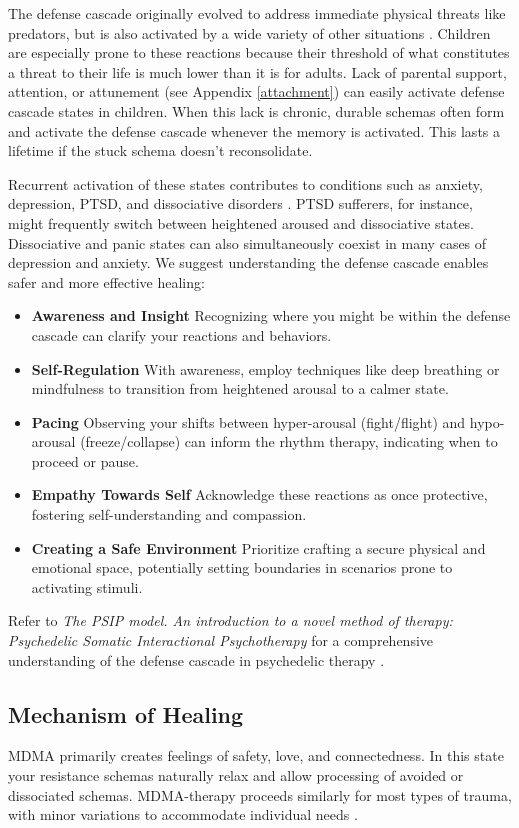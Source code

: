 \documentclass[12pt,letterpaper]{book}
\begin{document}
The defense cascade originally evolved to address immediate physical threats like predators, but is also activated by a wide variety of other situations \cite{razviPSIP}. Children are especially prone to these reactions because their threshold of what constitutes a threat to their life is much lower than it is for adults. Lack of parental support, attention, or attunement (see Appendix \ref{attachment}) can easily activate defense cascade states in children. When this lack is chronic, durable schemas often form and activate the defense cascade whenever the memory is activated. This lasts a lifetime if the stuck schema doesn't reconsolidate.

Recurrent activation of these states contributes to conditions such as anxiety, depression, PTSD, and dissociative disorders \cite{razviPSIP}. PTSD sufferers, for instance, might frequently switch between heightened aroused and dissociative states. Dissociative and panic states can also simultaneously coexist in many cases of depression and anxiety. We suggest understanding the defense cascade enables safer and more effective healing:
\begin{itemize}
    \item \textbf{Awareness and Insight} Recognizing where you might be within the defense cascade can clarify your reactions and behaviors.
    \item \textbf{Self-Regulation} With awareness, employ techniques like deep breathing or mindfulness to transition from heightened arousal to a calmer state.
    \item \textbf{Pacing} Observing your shifts between hyper-arousal (fight/flight) and hypo-arousal (freeze/collapse) can inform the rhythm therapy, indicating when to proceed or pause. 
    \item \textbf{Empathy Towards Self} Acknowledge these reactions as once protective, fostering self-understanding and compassion.
    \item \textbf{Creating a Safe Environment} Prioritize crafting a secure physical and emotional space, potentially setting boundaries in scenarios prone to activating stimuli.
\end{itemize}

Refer to \textit{The PSIP model. An introduction to a novel method of therapy: Psychedelic Somatic Interactional Psychotherapy} for a comprehensive understanding of the defense cascade in psychedelic therapy \cite{razviPSIP}.
\subsection{Mechanism of Healing}
MDMA primarily creates feelings of safety, love, and connectedness. In this state your resistance schemas naturally relax and allow processing of avoided or dissociated schemas. MDMA-therapy proceeds similarly for most types of trauma, with minor variations to accommodate individual needs \cite{otaloraMDMA}.
\end{document}
